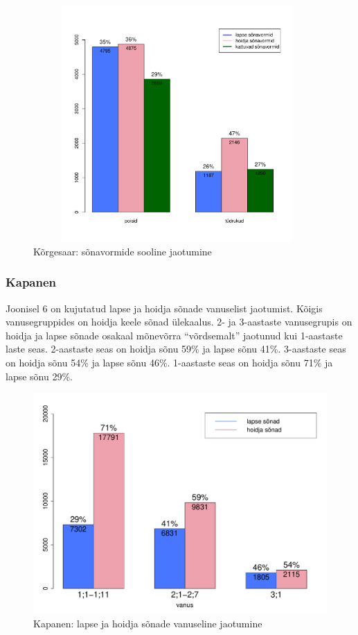 \documentclass[12pt]{article}
\begin{document}
\begin{figure}[H]
    \centering
    \includegraphics[width=11cm, height=9cm]{korgesaar_sugu}
    \caption{Kõrgesaar: sõnavormide sooline jaotumine}
\end{figure}




\subsubsection{Kapanen}

Joonisel 6 on kujutatud lapse ja hoidja sõnade vanuselist jaotumist. Kõigis vanusegruppides on hoidja keele sõnad ülekaalus. 2- ja 3-aastaste vanusegrupis on hoidja ja lapse sõnade osakaal mõnevõrra ``võrdsemalt'' jaotunud kui 1-aastaste laste seas. 2-aastaste seas on hoidja sõnu 59\% ja lapse sõnu 41\%. 3-aastaste seas on hoidja sõnu 54\% ja lapse sõnu 46\%. 1-aastaste seas on hoidja sõnu 71\% ja lapse sõnu 29\%.

\begin{figure}[H]
    \centering
    \includegraphics[width=\textwidth]{kapanen_vanus_sonad}
    \caption{Kapanen: lapse ja hoidja sõnade vanuseline jaotumine}
\end{figure}
\end{document}
